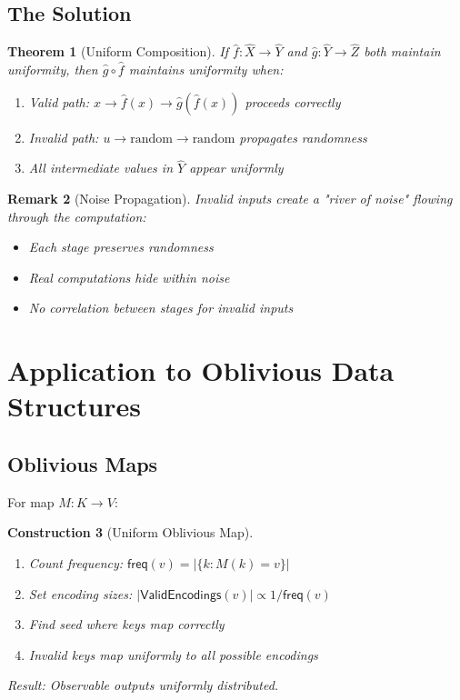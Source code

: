 \documentclass[11pt,final,hidelinks]{article}
\newcommand{\ValidEnc}[1]{\mathsf{ValidEncodings}(#1)}
\newcommand{\Freq}[1]{\mathsf{freq}(#1)}
\newtheorem{theorem}{Theorem}[section]
\newtheorem{remark}[theorem]{Remark}
\newtheorem{construction}[theorem]{Construction}
\begin{document}
\subsection{The Solution}

\begin{theorem}[Uniform Composition]
If $\hat{f}: \hat{X} \to \hat{Y}$ and $\hat{g}: \hat{Y} \to \hat{Z}$ both maintain uniformity, then $\hat{g} \circ \hat{f}$ maintains uniformity when:
\begin{enumerate}
    \item Valid path: $x \to \hat{f}(x) \to \hat{g}(\hat{f}(x))$ proceeds correctly
    \item Invalid path: $u \to \text{random} \to \text{random}$ propagates randomness
    \item All intermediate values in $\hat{Y}$ appear uniformly
\end{enumerate}
\end{theorem}

\begin{remark}[Noise Propagation]
Invalid inputs create a "river of noise" flowing through the computation:
\begin{itemize}
    \item Each stage preserves randomness
    \item Real computations hide within noise
    \item No correlation between stages for invalid inputs
\end{itemize}
\end{remark}

\section{Application to Oblivious Data Structures}

\subsection{Oblivious Maps}

For map $M: K \to V$:

\begin{construction}[Uniform Oblivious Map]
\begin{enumerate}
    \item Count frequency: $\Freq{v} = |\{k : M(k) = v\}|$
    \item Set encoding sizes: $|\ValidEnc{v}| \propto 1/\Freq{v}$
    \item Find seed where keys map correctly
    \item Invalid keys map uniformly to all possible encodings
\end{enumerate}
Result: Observable outputs uniformly distributed.
\end{construction}
\end{document}
